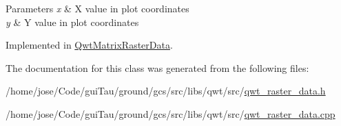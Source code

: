 \begin{DoxyParams}{Parameters}
{\em x} & X value in plot coordinates \\
\hline
{\em y} & Y value in plot coordinates \\
\hline
\end{DoxyParams}


Implemented in \hyperlink{class_qwt_matrix_raster_data_a49952670063166bccdbfb9cdbd7b56e8}{Qwt\-Matrix\-Raster\-Data}.



The documentation for this class was generated from the following files\-:\begin{DoxyCompactItemize}
\item 
/home/jose/\-Code/gui\-Tau/ground/gcs/src/libs/qwt/src/\hyperlink{qwt__raster__data_8h}{qwt\-\_\-raster\-\_\-data.\-h}\item 
/home/jose/\-Code/gui\-Tau/ground/gcs/src/libs/qwt/src/\hyperlink{qwt__raster__data_8cpp}{qwt\-\_\-raster\-\_\-data.\-cpp}\end{DoxyCompactItemize}
